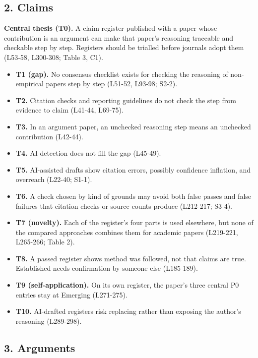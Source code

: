 {\subsection{2. Claims}\label{claims}

\textbf{Central thesis (T0).} A claim register published with a paper
whose contribution is an argument can make that paper's reasoning
traceable and checkable step by step. Registers should be trialled
before journals adopt them (L53-58, L300-308; Table 3, C1).

\begin{itemize}
\tightlist
\item
  \textbf{T1 (gap).} No consensus checklist exists for checking the
  reasoning of non-empirical papers step by step (L51-52, L93-98; S2-2).
\item
  \textbf{T2.} Citation checks and reporting guidelines do not check the
  step from evidence to claim (L41-44, L69-75).
\item
  \textbf{T3.} In an argument paper, an unchecked reasoning step means
  an unchecked contribution (L42-44).
\item
  \textbf{T4.} AI detection does not fill the gap (L45-49).
\item
  \textbf{T5.} AI-assisted drafts show citation errors, possibly
  confidence inflation, and overreach (L22-40; S1-1).
\item
  \textbf{T6.} A check chosen by kind of grounds may avoid both false
  passes and false failures that citation checks or source counts
  produce (L212-217; S3-4).
\item
  \textbf{T7 (novelty).} Each of the register's four parts is used
  elsewhere, but none of the compared approaches combines them for
  academic papers (L219-221, L265-266; Table 2).
\item
  \textbf{T8.} A passed register shows method was followed, not that
  claims are true. Established needs confirmation by someone else
  (L185-189).
\item
  \textbf{T9 (self-application).} On its own register, the paper's three
  central P0 entries stay at Emerging (L271-275).
\item
  \textbf{T10.} AI-drafted registers risk replacing rather than exposing
  the author's reasoning (L289-298).
\end{itemize}

\subsection{3. Arguments}\label{arguments}

}
